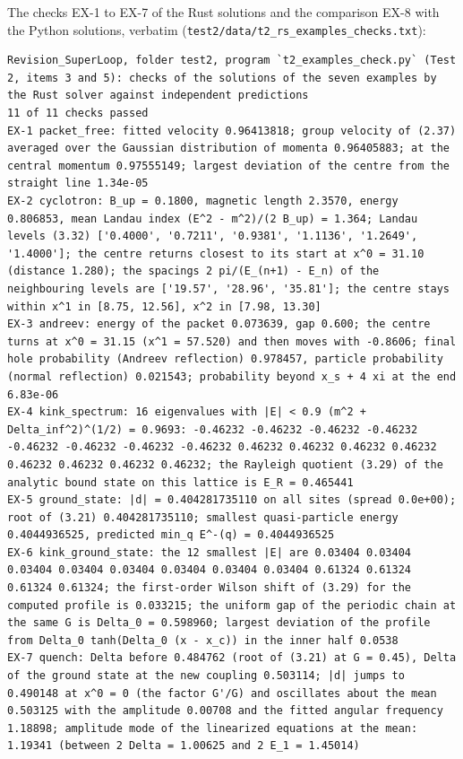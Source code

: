 \documentclass[
  10pt,
]{article}
\begin{document}
The checks EX-1 to EX-7 of the Rust solutions and the comparison EX-8
with the Python solutions, verbatim
(\texttt{test2/data/t2\_rs\_examples\_checks.txt}):

\begin{verbatim}
Revision_SuperLoop, folder test2, program `t2_examples_check.py` (Test 2, items 3 and 5): checks of the solutions of the seven examples by the Rust solver against independent predictions
11 of 11 checks passed
EX-1 packet_free: fitted velocity 0.96413818; group velocity of (2.37) averaged over the Gaussian distribution of momenta 0.96405883; at the central momentum 0.97555149; largest deviation of the centre from the straight line 1.34e-05
EX-2 cyclotron: B_up = 0.1800, magnetic length 2.3570, energy 0.806853, mean Landau index (E^2 - m^2)/(2 B_up) = 1.364; Landau levels (3.32) ['0.4000', '0.7211', '0.9381', '1.1136', '1.2649', '1.4000']; the centre returns closest to its start at x^0 = 31.10 (distance 1.280); the spacings 2 pi/(E_(n+1) - E_n) of the neighbouring levels are ['19.57', '28.96', '35.81']; the centre stays within x^1 in [8.75, 12.56], x^2 in [7.98, 13.30]
EX-3 andreev: energy of the packet 0.073639, gap 0.600; the centre turns at x^0 = 31.15 (x^1 = 57.520) and then moves with -0.8606; final hole probability (Andreev reflection) 0.978457, particle probability (normal reflection) 0.021543; probability beyond x_s + 4 xi at the end 6.83e-06
EX-4 kink_spectrum: 16 eigenvalues with |E| < 0.9 (m^2 + Delta_inf^2)^(1/2) = 0.9693: -0.46232 -0.46232 -0.46232 -0.46232 -0.46232 -0.46232 -0.46232 -0.46232 0.46232 0.46232 0.46232 0.46232 0.46232 0.46232 0.46232 0.46232; the Rayleigh quotient (3.29) of the analytic bound state on this lattice is E_R = 0.465441
EX-5 ground_state: |d| = 0.404281735110 on all sites (spread 0.0e+00); root of (3.21) 0.404281735110; smallest quasi-particle energy 0.4044936525, predicted min_q E^-(q) = 0.4044936525
EX-6 kink_ground_state: the 12 smallest |E| are 0.03404 0.03404 0.03404 0.03404 0.03404 0.03404 0.03404 0.03404 0.61324 0.61324 0.61324 0.61324; the first-order Wilson shift of (3.29) for the computed profile is 0.033215; the uniform gap of the periodic chain at the same G is Delta_0 = 0.598960; largest deviation of the profile from Delta_0 tanh(Delta_0 (x - x_c)) in the inner half 0.0538
EX-7 quench: Delta before 0.484762 (root of (3.21) at G = 0.45), Delta of the ground state at the new coupling 0.503114; |d| jumps to 0.490148 at x^0 = 0 (the factor G'/G) and oscillates about the mean 0.503125 with the amplitude 0.00708 and the fitted angular frequency 1.18898; amplitude mode of the linearized equations at the mean: 1.19341 (between 2 Delta = 1.00625 and 2 E_1 = 1.45014)

\end{verbatim}
\end{document}

